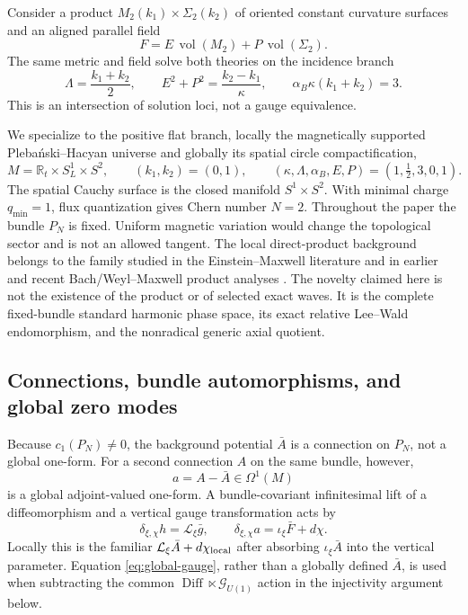 \documentclass[11pt]{article}
\theoremstyle{remark}
\newcommand{\R}{\mathbb R}
\newcommand{\Diff}{\operatorname{Diff}}
\newcommand{\vol}{\operatorname{vol}}
\begin{document}
Consider a product $M_2(k_1)\times\Sigma_2(k_2)$ of oriented constant
curvature surfaces and an aligned parallel field
\begin{equation}
 F=E\,\vol(M_2)+P\,\vol(\Sigma_2).
\end{equation}
The same metric and field solve both theories on the incidence branch
\begin{equation}\label{eq:incidence}
 \Lambda=\frac{k_1+k_2}{2},\qquad
 E^2+P^2=\frac{k_2-k_1}{\kappa},\qquad
 \alpha_B\kappa(k_1+k_2)=3.
\end{equation}
This is an intersection of solution loci, not a gauge equivalence.

We specialize to the positive flat branch, locally the magnetically supported
Pleba\'nski--Hacyan universe and globally its spatial circle compactification,
\begin{equation}\label{eq:fixture}
 M=\R_t\times S^1_L\times S^2,\qquad
 (k_1,k_2)=(0,1),\qquad
 (\kappa,\Lambda,\alpha_B,E,P)=(1,\tfrac12,3,0,1).
\end{equation}
The spatial Cauchy surface is the closed manifold $S^1\times S^2$. With
minimal charge $q_{\min}=1$, flux quantization gives Chern number $N=2$.
Throughout the paper the bundle $P_N$ is fixed. Uniform magnetic variation
would change the topological sector and is not an allowed tangent.
The local direct-product background belongs to the family studied in the
Einstein--Maxwell literature \cite{PlebanskiHacyan,KrtousEtAl,Ortaggio} and
in earlier and recent Bach/Weyl--Maxwell product analyses
\cite{FiedlerSchimming,JizbaLeheckova}. The novelty claimed here is not the
existence of the product or of selected exact waves. It is the complete
fixed-bundle standard harmonic phase space, its exact relative Lee--Wald
endomorphism, and the nonradical generic axial quotient.

\subsection{Connections, bundle automorphisms, and global zero modes}
Because $c_1(P_N)\neq0$, the background potential $\bar A$ is a connection on
$P_N$, not a global one-form. For a second connection $A$ on the same bundle,
however,
\begin{equation}
 a=A-\bar A\in\Omega^1(M)
\end{equation}
is a global adjoint-valued one-form. A bundle-covariant infinitesimal lift of
a diffeomorphism and a vertical gauge transformation acts by
\begin{equation}\label{eq:global-gauge}
 \delta_{\xi,\chi}h=\mathcal L_\xi\bar g,\qquad
 \delta_{\xi,\chi}a=\iota_\xi\bar F+d\chi .
\end{equation}
Locally this is the familiar
$\mathcal L_\xi\bar A+d\chi_{\rm local}$ after absorbing
$\iota_\xi\bar A$ into the vertical parameter. Equation
\eqref{eq:global-gauge}, rather than a globally defined $\bar A$, is used when
subtracting the common $\Diff\ltimes\mathcal G_{U(1)}$ action in the
injectivity argument below.
\end{document}
